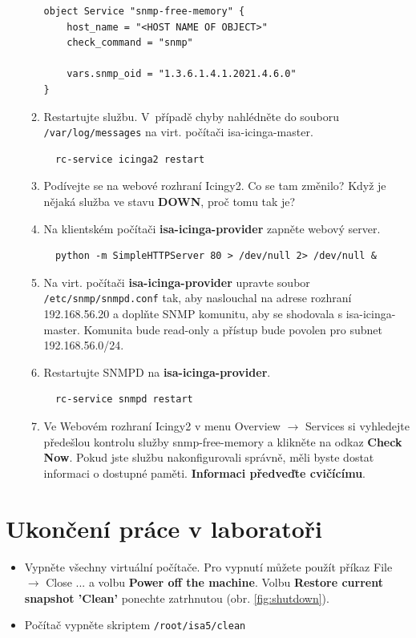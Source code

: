 \begin{itemize}
\begin{enumerate}
\begin{verbatim}
object Service "snmp-free-memory" {
    host_name = "<HOST NAME OF OBJECT>"
    check_command = "snmp"
    
    vars.snmp_oid = "1.3.6.1.4.1.2021.4.6.0"
}

\end{verbatim} 
            \item Restartujte službu. V~případě chyby nahlédněte do souboru {\tt /var/log/messages} na virt. počítači isa-icinga-master.
\begin{verbatim}
  rc-service icinga2 restart
\end{verbatim} 
          \item Podívejte se na webové rozhraní Icingy2. Co se tam změnilo? 
          Když je nějaká služba ve stavu {\bf DOWN}, proč tomu tak je?

          \item Na klientském počítači {\bf isa-icinga-provider} zapněte webový server.
\begin{verbatim}
  python -m SimpleHTTPServer 80 > /dev/null 2> /dev/null &
\end{verbatim}

          \item Na virt. počítači {\bf isa-icinga-provider} upravte soubor {\tt /etc/snmp/snmpd.conf} tak, aby naslouchal na adrese rozhraní 192.168.56.20 a doplňte SNMP komunitu, aby se shodovala s isa-icinga-master. Komunita bude read-only
          a přístup bude povolen pro subnet 192.168.56.0/24.
          
          \item Restartujte SNMPD na {\bf isa-icinga-provider}.
\begin{verbatim}
  rc-service snmpd restart
\end{verbatim}
          \item Ve Webovém rozhraní Icingy2 v menu Overview $\rightarrow$
            Services si vyhledejte předešlou kontrolu služby snmp-free-memory a
            klikněte na odkaz {\bf Check Now}. Pokud jste službu nakonfigurovali správně, měli byste dostat informaci o dostupné paměti. {\bf Informaci předveďte cvičícímu}.
          
\end{enumerate}
\end{itemize}

\section*{Ukončení práce v laboratoři}
\begin{itemize}

  \item Vypněte všechny virtuální počítače. Pro vypnutí můžete použít příkaz File $\rightarrow$ Close ... a volbu {\bf Power off the machine}. Volbu {\bf Restore current snapshot 'Clean'} ponechte zatrhnutou (obr. \ref{fig:shutdown}).
  \item Počítač vypněte skriptem {\tt /root/isa5/clean}
\end{itemize}

